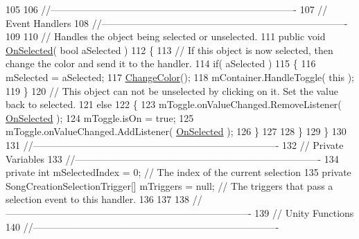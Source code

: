 \begin{DoxyCodeInclude}
105 
106             \textcolor{comment}{//---------------------------------------------------------------------------- }
107             \textcolor{comment}{// Event Handlers}
108             \textcolor{comment}{//---------------------------------------------------------------------------- }
109 
110             \textcolor{comment}{// Handles the object being selected or unselected.}
111             \textcolor{keyword}{public} \textcolor{keywordtype}{void} \hyperlink{group___s_c_m_nest_class_a6477d6c5056af7998063e90e282b67ae}{OnSelected}( \textcolor{keywordtype}{bool} aSelected )
112             \{
113                 \textcolor{comment}{// If this object is now selected, then change the color and send it to the handler.}
114                 \textcolor{keywordflow}{if}( aSelected )
115                 \{
116                     mSelected = aSelected;
117                     \hyperlink{group___s_c_m_nest_class_a26bd7667a86c8dc85429a5e4798dd30a}{ChangeColor}();
118                     mContainer.HandleToggle( \textcolor{keyword}{this} );
119                 \}
120                 \textcolor{comment}{// This object can not be unselected by clicking on it. Set the value back to selected.}
121                 \textcolor{keywordflow}{else}
122                 \{
123                     mToggle.onValueChanged.RemoveListener( \hyperlink{group___s_c_m_nest_class_a6477d6c5056af7998063e90e282b67ae}{OnSelected} );
124                     mToggle.isOn = \textcolor{keyword}{true};
125                     mToggle.onValueChanged.AddListener( \hyperlink{group___s_c_m_nest_class_a6477d6c5056af7998063e90e282b67ae}{OnSelected} );
126                 \}
127 
128             \}
129         \}
130 
131         \textcolor{comment}{//---------------------------------------------------------------------------- }
132         \textcolor{comment}{// Private Variables}
133         \textcolor{comment}{//----------------------------------------------------------------------------}
134         \textcolor{keyword}{private} \textcolor{keywordtype}{int} mSelectedIndex = 0; \textcolor{comment}{// The index of the current selection}
135         \textcolor{keyword}{private} SongCreationSelectionTrigger[] mTriggers = null; \textcolor{comment}{// The triggers that pass a selection
       event to this handler.}
136 
137 
138         \textcolor{comment}{//---------------------------------------------------------------------------- }
139         \textcolor{comment}{// Unity Functions}
140         \textcolor{comment}{//----------------------------------------------------------------------------}

\end{DoxyCodeInclude}
